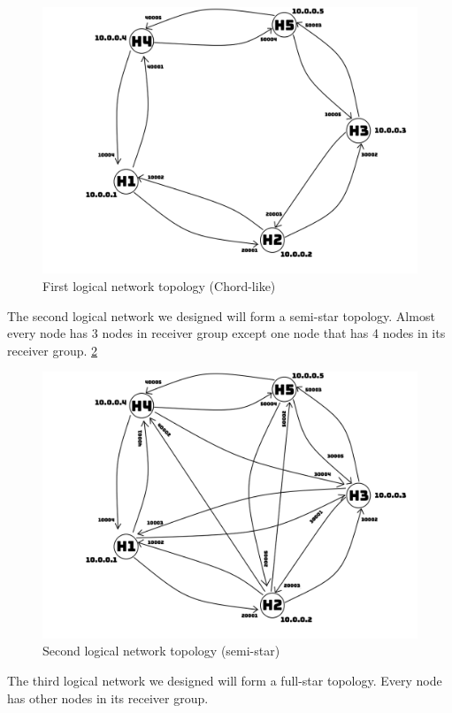 \documentclass[a4paper, 12pt]{article}
\begin{document}
\begin{figure}[h]
\centering
   \includegraphics[scale=0.50]{conf2.png}
   \caption{First logical network topology (Chord-like)}
   \label{chord}
\end{figure}


The second logical network we designed will form a semi-star topology. Almost every node has 3 nodes in receiver group except one node that has 4 nodes in its receiver group. \ref{semi-star}


\begin{figure}[h]
\centering
   \includegraphics[scale=0.50]{conf3.png}
   \caption{Second logical network topology (semi-star)}
   \label{semi-star}
\end{figure}

The third logical network we designed will form a full-star topology. Every node has other nodes in its receiver group.
\end{document}
